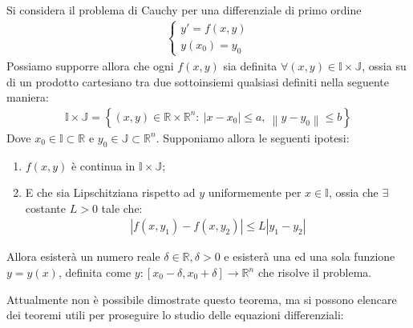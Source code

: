 \documentclass[a4paper, oneside]{book}
\begin{document}
\begin{theorem}
    Si considera il problema di Cauchy per una differenziale di primo
    ordine 
    \begin{gather*}
        \left\{\begin{array}{l}
            y' = f(x, y) \\
            y(x_0) = y_0
        \end{array}\right.
    \end{gather*}
    Possiamo supporre allora che ogni $f(x, y)$ sia definita $\forall (x, y) \in \mathbb{I} \times \mathbb{J}$, ossia su di un
    prodotto cartesiano tra due sottoinsiemi qualsiasi definiti nella 
    seguente maniera:
    \begin{align}
        \mathbb{I} \times \mathbb{J} = \left\{(x, y) \in \mathbb{R} \times \mathbb{R}^{n} : \ \left| x - x_0 \right| \leq a, \ \left\lVert y - y_0 \right\rVert  \leq b \right\}
    \end{align}
    Dove $x_0 \in \mathbb{I} \subset \mathbb{R}$ e $y_0 \in \mathbb{J} \subset \mathbb{R}^{n}$. 
    Supponiamo allora le seguenti ipotesi:
    \begin{enumerate}
        \item $f(x, y)$ è continua in $\mathbb{I} \times \mathbb{J}$;
        \item E che sia Lipschitziana rispetto ad $y$ uniformemente per $x \in \mathbb{I}$,
        ossia che $\exists$ costante $L > 0$ tale che:
        \begin{gather*}
            \left| f(x, y_1) - f(x, y_2) \right| \leq L\left| y_1 - y_2 \right|  
        \end{gather*} 
    \end{enumerate}
    Allora esisterà un numero reale $\delta \in \mathbb{R}, \delta > 0$ e esisterà una ed una sola  funzione $y = y(x)$,
    definita come $y :[x_0 - \delta, x_0 + \delta] \to \mathbb{R}^{n}$ che risolve il problema.
\end{theorem} \noindent
Attualmente non è possibile dimostrate questo teorema, ma si possono elencare dei teoremi utili
per proseguire lo studio delle equazioni differenziali:
\end{document}
